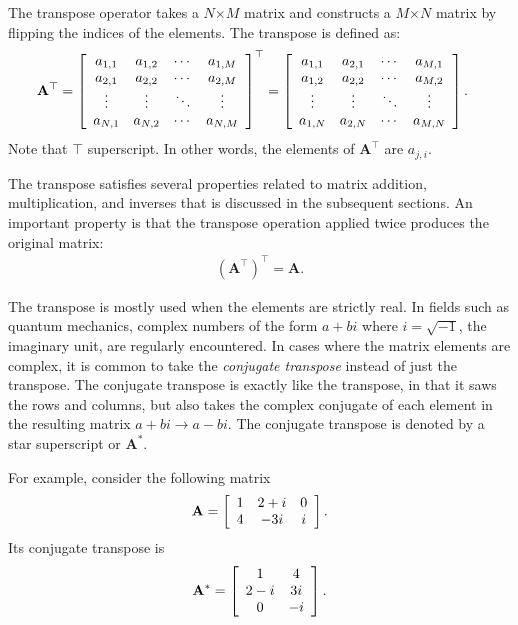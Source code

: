 The transpose operator takes a $N$$\times$$M$ matrix and constructs a $M$$\times$$N$ matrix by flipping the indices of the elements. The transpose is defined as:
\begin{align}
  \mathbf{A}^\top &= 
    \left[ \begin{array}{c c c c} a_{1,1} & a_{1,2} & \cdots & a_{1,M} \\
  		  	 					  a_{2,1} & a_{2,2} & \cdots & a_{2,M} \\
								  \vdots  & \vdots  & \ddots & \vdots  \\
								  a_{N,1} & a_{N,2} & \cdots & a_{N,M} \\ \end{array} \right]^\top 
 = \left[ \begin{array}{c c c c}  a_{1,1} & a_{2,1} & \cdots & a_{M,1} \\
  		  	 					  a_{1,2} & a_{2,2} & \cdots & a_{M,2} \\
								  \vdots  & \vdots  & \ddots & \vdots  \\
								  a_{1,N} & a_{2,N} & \cdots & a_{M,N} \\ \end{array} \right].		
\end{align}
Note that $\top$ superscript. In other words, the elements of $\mathbf{A}^\top$ are $a_{j,i}$.

The transpose satisfies several properties related to matrix addition, multiplication, and inverses that is discussed in the subsequent sections. An important property is that the transpose operation applied twice produces the original matrix:
\begin{align}
  \left( \mathbf{A}^\top \right)^\top = \mathbf{A}.
\end{align}

The transpose is mostly used when the elements are strictly real. In fields such as quantum mechanics, complex numbers of the form $a + bi$ where $i = \sqrt{-1}$, the imaginary unit, are regularly encountered. In cases where the matrix elements are complex, it is common to take the \emph{conjugate transpose} instead of just the transpose. The conjugate transpose is exactly like the transpose, in that it saws the rows and columns, but also takes the complex conjugate of each element in the resulting matrix $a + bi \rightarrow a - bi$. The conjugate transpose is denoted by a star superscript or $\mathbf{A}^*$. 

For example, consider the following matrix
\begin{align}
  \mathbf{A}  = \left[ \begin{array}{c c c} 1 & 2 + i & 0 \\ 4 & -3i & i \\ \end{array} \right] . \nonumber
\end{align}
Its conjugate transpose is
\begin{align}
  \mathbf{A}^*  = \left[ \begin{array}{c c} 1 & 4 \\ 2 - i & 3i \\ 0 & -i \end{array} \right] . \nonumber
\end{align}


